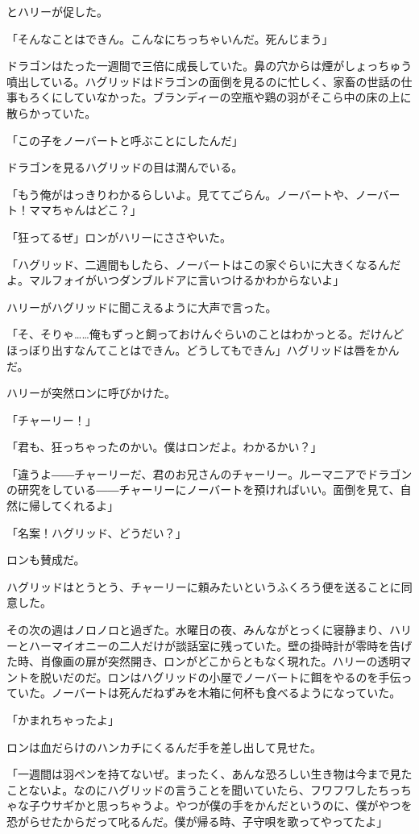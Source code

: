 \documentclass[10pt,a4paper]{article}
\begin{document}
\begin{CJK}{UTF8}{min}
とハリーが促した。

「そんなことはできん。こんなにちっちゃいんだ。死んじまう」

ドラゴンはたった一週間で三倍に成長していた。鼻の穴からは煙がしょっちゅう噴出している。ハグリッドはドラゴンの面倒を見るのに忙しく、家畜の世話の仕事もろくにしていなかった。ブランディーの空瓶や鶏の羽がそこら中の床の上に散らかっていた。

「この子をノーバートと呼ぶことにしたんだ」

ドラゴンを見るハグリッドの目は潤んでいる。

「もう俺がはっきりわかるらしいよ。見ててごらん。ノーバートや、ノーバート！ママちゃんはどこ？」

「狂ってるぜ」ロンがハリーにささやいた。

「ハグリッド、二週間もしたら、ノーバートはこの家ぐらいに大きくなるんだよ。マルフォイがいつダンブルドアに言いつけるかわからないよ」

ハリーがハグリッドに聞こえるように大声で言った。

「そ、そりゃ……俺もずっと飼っておけんぐらいのことはわかっとる。だけんどほっぼり出すなんてことはできん。どうしてもできん」ハグリッドは唇をかんだ。

ハリーが突然ロンに呼びかけた。

「チャーリー！」

「君も、狂っちゃったのかい。僕はロンだよ。わかるかい？」

「違うよ――チャーリーだ、君のお兄さんのチャーリー。ルーマニアでドラゴンの研究をしている――チャーリーにノーバートを預ければいい。面倒を見て、自然に帰してくれるよ」

「名案！ハグリッド、どうだい？」

ロンも賛成だ。

ハグリッドはとうとう、チャーリーに頼みたいというふくろう便を送ることに同意した。



その次の週はノロノロと過ぎた。水曜日の夜、みんながとっくに寝静まり、ハリーとハーマイオニーの二人だけが談話室に残っていた。壁の掛時計が零時を告げた時、肖像画の扉が突然開き、ロンがどこからともなく現れた。ハリーの透明マントを脱いだのだ。ロンはハグリッドの小屋でノーバートに餌をやるのを手伝っていた。ノーバートは死んだねずみを木箱に何杯も食べるようになっていた。

「かまれちゃったよ」

ロンは血だらけのハンカチにくるんだ手を差し出して見せた。

「一週間は羽ペンを持てないぜ。まったく、あんな恐ろしい生き物は今まで見たことないよ。なのにハグリッドの言うことを聞いていたら、フワフワしたちっちゃな子ウサギかと思っちゃうよ。やつが僕の手をかんだというのに、僕がやつを恐がらせたからだって叱るんだ。僕が帰る時、子守唄を歌ってやってたよ」


\end{CJK}
\end{document}
